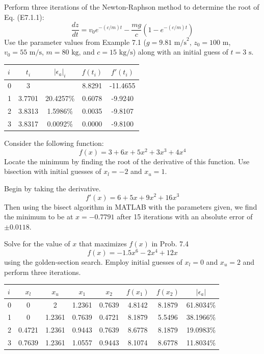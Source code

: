 \documentclass{article}
\begin{document}
\setcounter{problem}{0}
\begin{problem}
Perform three iterations of the Newton-Raphson method to determine the root of Eq. (E7.1.1):
\[ \frac{dz}{dt} = v_{0}e^{-(c/m)t} - \frac{mg}{c}\left( 1 - e^{-(c/m)t} \right)\]
Use the parameter values from Example 7.1 ($g = 9.81 \text{ m/s}^{2}$, $z_{0} = 100 \text{ m}$, $v_{0} = 55 \text{ m/s}$, $m = 80 \text{ kg}$, and $c = 15 \text{ kg/s}$) along with an initial guess of $t = 3 \text{ s}$.
\end{problem}

\begin{center}
	\begin{tabular}{| l c c | c c |}
\hline
$i$	&	$t_{i}$	&	$| \epsilon_a |_{i}$	&	$f(t_{i})$	&	$f'(t_{i})$\\
\hline
0	&	3		&							&	8.8291		&	-11.4655\\ 
1	&	3.7701	&	20.4257\%				&	0.6078		&	-9.9240\\ 
2	&	3.8313	&	1.5986\%				&	0.0035		&	-9.8107\\ 
3	&	3.8317	&	0.0092\%				&	0.0000		&	-9.8100\\
\hline
	\end{tabular}
\end{center}

\setcounter{problem}{2}
\begin{problem}
Consider the following function:
\[ f(x) = 3 + 6x + 5x^{2} + 3x^{3} + 4x^{4} \]
Locate the minimum by finding the root of the derivative of this function. Use bisection with initial guesses of $x_{l} = -2$ and $x_{u} = 1$.
\end{problem}

Begin by taking the derivative.
\[ f'(x) = 6 + 5x +9x^{2} + 16x^{3} \]
Then using the bisect algorithm in MATLAB with the parameters given, we find the minimum to be at $x=-0.7791$ after 15 iterations with an absolute error of $\pm 0.0118$.


\setcounter{problem}{4}
\begin{problem}
Solve for the value of $x$ that maximizes $f(x)$ in Prob. 7.4 
\[ f(x) = -1.5x^{6} - 2x^{4} + 12x \]
using the golden-section search. Employ initial guesses of $x_{l} = 0$ and $x_{u} = 2$ and perform three iterations. 
\end{problem}

\begin{center}
	\begin{tabular}{| l | c c | c c | c c |c |}
\hline
$i$	&	$x_{l}$	&	$x_{u}$	&	$x_{1}$	&	$x_{2}$	&	$f(x_{1})$	&	$f(x_{2})$	&	$|\epsilon_{a}|$\\
\hline
0	&	0		&	2		&	1.2361	&	0.7639	&	4.8142		&	8.1879		&	61.8034\%\\
1	&	0		&	1.2361	&	0.7639	&	0.4721	&	8.1879		&	5.5496		&	38.1966\%\\
2	&	0.4721	&	1.2361	&	0.9443	&	0.7639	&	8.6778		&	8.1879		&	19.0983\%\\
3	&	0.7639	&	1.2361	&	1.0557	&	0.9443	&	8.1074		&	8.6778		&	11.8034\%\\
\hline
	\end{tabular}
\end{center}
\end{document}
